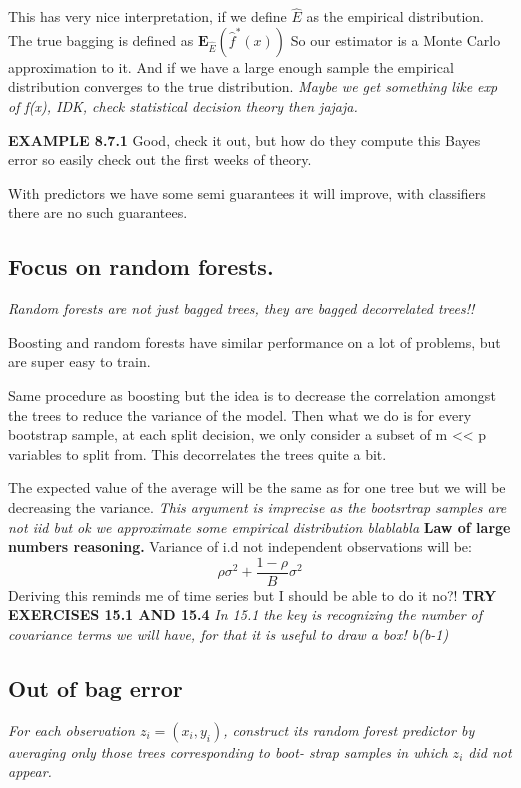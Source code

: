 \documentclass{article}
\begin{document}
This has very nice interpretation, if we define $\hat{E}$ as the empirical distribution.
The true bagging is defined as $\textbf{E}_{\hat{E}}(\hat{f}^*(x))$ So our estimator is a Monte Carlo approximation to it. And if we have a large enough sample the empirical distribution converges to the true distribution. \textit{Maybe we get something like exp of f(x), IDK, check statistical decision theory then jajaja. }

\textbf{EXAMPLE 8.7.1} Good, check it out, but how do they compute this Bayes error so easily check out the first weeks of theory.

With predictors we have some semi guarantees it will improve, with classifiers there are no such guarantees.

\subsection*{Focus on random forests.}
\textit{Random forests are not just bagged trees, they are bagged decorrelated trees!!}

Boosting and random forests have similar performance on a lot of problems, but are super easy to train.

Same procedure as boosting but the idea is to decrease the correlation amongst the trees to reduce the variance of the model.
Then what we do is for every bootstrap sample, at each split decision, we only consider a subset of m << p variables to split from. This decorrelates the trees quite a bit.

The expected value of the average will be the same as for one tree but we will be decreasing the variance. \textit{This argument is imprecise as the bootsrtrap samples are not iid but ok we approximate some empirical distribution blablabla} \textbf{Law of large numbers reasoning.}
Variance of i.d not independent observations will be:
$$\rho \sigma^2 + \frac{1-\rho}{B}\sigma^2$$
Deriving this reminds me of time series but I should be able to do it no?!
\textbf{TRY EXERCISES 15.1 AND 15.4}
\textit{In 15.1 the key is recognizing the number of covariance terms we will have, for that it is useful to draw a box! b(b-1)}

\subsection*{Out of bag error}
\textit{For each observation $z_i = (x_i, y_i)$, construct its random forest
predictor by averaging only those trees corresponding to boot-
strap samples in which $z_i$ did not appear.}
\end{document}
